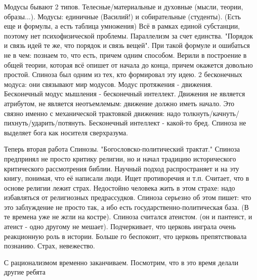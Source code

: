 Модусы бывают 2 типов. Телесные/материальные и духовные (мысли, теории, образы...). Модусы: единичные (Василий!) и собирательные (студенты). (Есть еще и формулы, а есть таблица умножения) 
Всё в рамках единой субстанции, поэтому нет психофизической проблемы. Параллелизм за счет единства. "Порядок и связь идей те же, что порядок и связь вещей". При такой формуле и ошибаться не в чем: познаем то, что есть, причем одним способом. Верили в построение в общей теории, которая всё опишет от начала до конца, причем окажется довольно простой. Спиноза был одним из тех, кто формировал эту идею.
2 бесконечных модуса: они связывают мир модусов. Модус протяжения - движения. Бесконечный модус мышления - бесконечный интеллект. Движения не является атрибутом, не является неотъемлемым: движение должно иметь начало. Это связно именно с механической трактовкой движения: надо толкнуть/качнуть/пихнуть/ударить/потянуть.
Бесконечный интеллект - какой-то бред. Спиноза не выделяет бога как носителя сверхразума.

Теперь вторая работа Спинозы. "Богословско-политический трактат." Спиноза предпринял не просто критику религии, но и начал традицию исторического критического рассмотрения библии. Научный подход распространяет и на эту книгу, понимая, что её написали люди. Ищет противоречия и т.п. Считает, что в основе религии лежит страх. Недостойно человека жить в этом страхе: надо избавляться от религиозных предрассудков. Спиноза серьезно об этом пишет: что это заблуждение не просто так, а ибо есть государственно-политическая база. (В те времена уже не жгли на костре). Спиноза считался атеистом. (он и пантеист, и атеист - одно другому не мешает). Подчеркивает, что церковь инграла очень реакционную роль в истории. Больше го беспокоит, что церковь препятствовала познанию. Страх, невежество.

С рационализмом временно заканчиваем. Посмотрим, что в это время делали другие ребята
